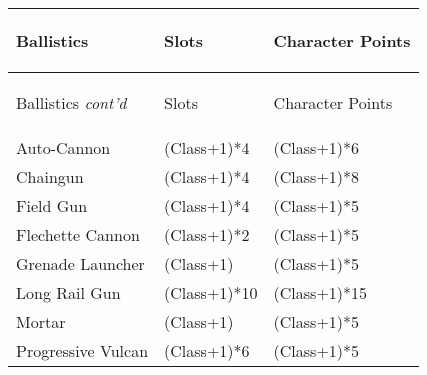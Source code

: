 \documentclass[twoside]{book}
\begin{document}
\begin{longtable}{p{1.25in}ll} 
  Ballistics
  &
  \begin{turn}{70}{Slots}\end{turn}
          
  &
  \begin{turn}{70}{Character Points}\end{turn}
          
  \\
  \hline
  \hline
  \endfirsthead
  Ballistics \textit{cont'd}
        
  &
  \begin{turn}{70}{Slots}\end{turn}
          
  &
  \begin{turn}{70}{Character Points}\end{turn}
          
  \\
  \hline
  \endhead
      
  \raggedright
           Auto-Cannon 
  &
   (Class+1)*4 
  &
   (Class+1)*6
           
  \tabularnewline
      
  \raggedright
           Chaingun 
  &
   (Class+1)*4 
  &
   (Class+1)*8
           
  \tabularnewline
      
  \raggedright
           Field Gun 
  &
   (Class+1)*4 
  &
   (Class+1)*5
           
  \tabularnewline
      
  \raggedright
           Flechette Cannon 
  &
   (Class+1)*2 
  &
   (Class+1)*5
           
  \tabularnewline
      
  \raggedright
           Grenade Launcher 
  &
   (Class+1) 
  &
   (Class+1)*5
           
  \tabularnewline
      
  \raggedright
           Long Rail Gun 
  &
   (Class+1)*10 
  &
   (Class+1)*15
           
  \tabularnewline
      
  \raggedright
           Mortar 
  &
   (Class+1) 
  &
   (Class+1)*5
           
  \tabularnewline
      
  \raggedright
           Progressive Vulcan 
  &
   (Class+1)*6 
  &
   (Class+1)*5
           
  \tabularnewline
      

\end{longtable}
\end{document}
